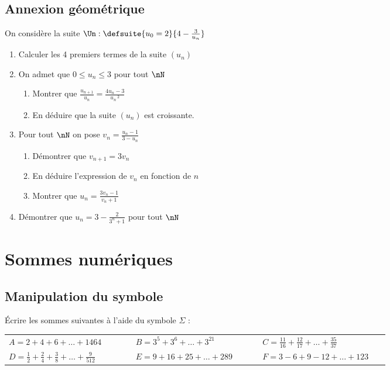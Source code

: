 \documentclass[oneside,12pt]{book}          %
\begin{document}
\subsection{Annexion géométrique}
On considère la suite $\Un:\defsuite{u_0=2}{4-\frac{3}{u_n}}$
\begin{enumerate}
	\item Calculer les 4 premiers termes de la suite $(u_n)$
	\item On admet que $0\leq u_n\leq3$ pour tout $\nN$
	\begin{enumerate}
		\item Montrer que $\frac{u_{n+1}}{u_n}=\frac{4u_n-3}{u_n\,^2}$
		\item En déduire que la suite $(u_n)$ est croissante.
	\end{enumerate}
	\item Pour tout $\nN$ on pose $v_n=\frac{u_n-1}{3-u_n}$
	\begin{enumerate}
		\item Démontrer que $v_{n+1}=3v_n$
		\item En déduire l'expression de $v_n$ en fonction de $n$
		\item Montrer que $u_n=\frac{3v_n-1}{v_n+1}$
	\end{enumerate}
	\item Démontrer que $u_n=3-\frac{2}{3^n+1}$ pour tout $\nN$
\end{enumerate}




\section{Sommes numériques}

\subsection{Manipulation du symbole}
Écrire les sommes suivantes à l'aide du symbole $\Sigma$ : \\
\renewcommand{\arraystretch}{1.6}
\begin{tabular}{p{0.3\linewidth} p{0.3\linewidth} p{0.3\linewidth}}

    $A = 2+4+6+\ldots+1464$ & $B = 3^5+3^6+\ldots+3^{21}$ & $C = \frac{11}{16}+\frac{12}{17}+\ldots+\frac{35}{37}$\\
    $D = \frac{1}{2}+\frac{2}{4}+\frac{3}{8}+\ldots+\frac{9}{512}$ & $E = 9+16+25+\ldots+289$ & $F = 3-6+9-12+\ldots+123$    
\end{tabular}
\end{document}
